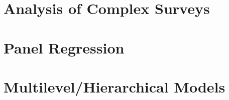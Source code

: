 \section{Analysis of Complex Surveys}
\frame{\tableofcontents[currentsection]}

\frame{\frametitle{}}


\section{Panel Regression}
\frame{\tableofcontents[currentsection]}

\frame{\frametitle{}}


\section{Multilevel/Hierarchical Models}
\frame{\tableofcontents[currentsection]}

\frame{\frametitle{}}



\appendix
\frame{}


